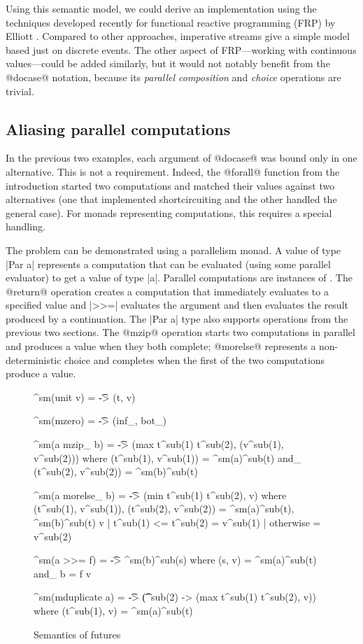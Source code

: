 \documentclass[preprint]{sigplanconf}
\begin{document}
Using this semantic model, we could derive an implementation using the techniques developed recently 
for functional reactive programming (FRP) by Elliott \cite{push-pull-frp}. Compared to other 
approaches, imperative streams give a simple model based just on discrete events. The other aspect 
of FRP---working with continuous values---could be added similarly, but it would not notably benefit 
from the @docase@ notation, because its \textit{parallel composition} and \textit{choice} operations
are trivial.


\subsection{Aliasing parallel computations}
\label{sec:intro-aliasing-parallel}

In the previous two examples, each argument of @docase@ was bound only in one alternative.
This is not a requirement. Indeed, the @forall@ function from the introduction started two 
computations and matched their values against two alternatives (one that implemented shortcircuiting
and the other handled the general case). For monads representing computations, this requires a special handling.

The problem can be demonstrated using a parallelism monad. A value of type
|Par a| represents a computation that can be evaluated (using some parallel evaluator) to get a 
value of type |a|. Parallel computations are instances of . The @return@
operation creates a computation that immediately evaluates to a specified value and |>>=| 
evaluates the argument and then evaluates the result produced by a continuation.
The |Par a| type also supports operations from the previous two sections. The @mzip@ operation 
starts two computations in parallel and produces a value when they both complete; @morelse@
represents a non-deterministic choice and completes when the first of the two computations 
produce a value.

\begin{figure}
\begin{code}
^sm(unit v)    = \t -> (t, v)

^sm(mzero)      = \t -> (inf_, bot_)

^sm(a mzip_ b)  = \t -> (max t^sub(1) t^sub(2), (v^sub(1), v^sub(2)))
	where  (t^sub(1), v^sub(1)) = ^sm(a)^sub(t) and_ (t^sub(2), v^sub(2)) = ^sm(b)^sub(t)

^sm(a morelse_ b)  = \t -> (min t^sub(1) t^sub(2), v)
	where  (t^sub(1), v^sub(1)), (t^sub(2), v^sub(2)) = ^sm(a)^sub(t), ^sm(b)^sub(t)
	       v | t^sub(1) <= t^sub(2) = v^sub(1) | otherwise = v^sub(2)

^sm(a >>= f)  = \t -> ^sm(b)^sub(s)
	where  (s, v) = ^sm(a)^sub(t) and_ b = f v

^sm(mduplicate a)  = \t -> (\t^sub(2) -> (max t^sub(1) t^sub(2), v))
	where (t^sub(1), v) = ^sm(a)^sub(t)
\end{code}
\label{fig:future-semantics}
\caption{Semantics of futures}
\end{figure}
\end{document}
